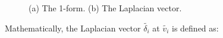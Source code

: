 \begin{figure} [htbp]
  \caption{(a) The 1-form. (b) The Laplacian vector.}
  \label{fig:edgebasedoneformlap} %
\end{figure}

Mathematically, the Laplacian vector $\tilde{\delta_i}$ at $\tilde{v_i}$ is defined as:

